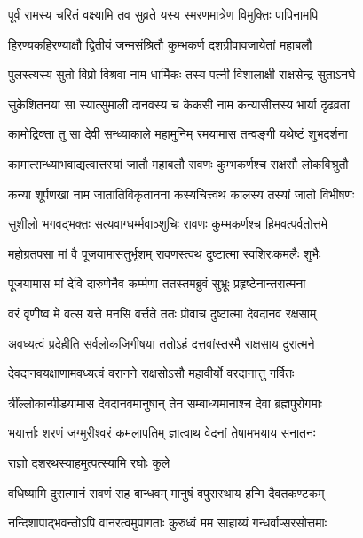 \twolineshloka
{पूर्वं रामस्य चरितं वक्ष्यामि तव सुव्रते}
{यस्य स्मरणमात्रेण विमुक्तिः पापिनामपि}%

\twolineshloka
{हिरण्यकहिरण्याक्षौ द्वितीयं जन्मसंश्रितौ}
{कुम्भकर्ण दशग्रीवावजायेतां महाबलौ}%

\twolineshloka
{पुलस्त्यस्य सुतो विप्रो विश्रवा नाम धार्मिकः}
{तस्य पत्नी विशालाक्षी राक्षसेन्द्र सुताऽनघे}%

\twolineshloka
{सुकेशितनया सा स्यात्सुमाली दानवस्य च}
{केकसी नाम कन्यासीत्तस्य भार्या दृढव्रता}%

\twolineshloka
{कामोद्रिक्ता तु सा देवी सन्ध्याकाले महामुनिम्}
{रमयामास तन्वङ्गी यथेष्टं शुभदर्शना}%

\twolineshloka
{कामात्सन्ध्याभवाद्यत्वात्तस्यां जातौ महाबलौ}
{रावणः कुम्भकर्णश्च राक्षसौ लोकविश्रुतौ}%

\twolineshloka
{कन्या शूर्पणखा नाम जातातिविकृतानना}
{कस्यचित्त्वथ कालस्य तस्यां जातो विभीषणः}%

\twolineshloka
{सुशीलो भगवद्भक्तः सत्यवाग्धर्म्मवाञ्शुचिः}
{रावणः कुम्भकर्णश्च हिमवत्पर्वतोत्तमे}%

\twolineshloka
{महोग्रतपसा मां वै पूजयामासतुर्भृशम्}
{रावणस्त्वथ दुष्टात्मा स्वशिरःकमलैः शुभैः}%

\twolineshloka
{पूजयामास मां देवि दारुणेनैव कर्म्मणा}
{ततस्तमब्रुवं सुभ्रूः प्रहृष्टेनान्तरात्मना}%

\twolineshloka
{वरं वृणीष्व मे वत्स यत्ते मनसि वर्त्तते}
{ततः प्रोवाच दुष्टात्मा देवदानव रक्षसाम्}%

\twolineshloka
{अवध्यत्वं प्रदेहीति सर्वलोकजिगीषया}
{ततोऽहं दत्तवांस्तस्मै राक्षसाय दुरात्मने}%

\twolineshloka
{देवदानवयक्षाणामवध्यत्वं वरानने}
{राक्षसोऽसौ महावीर्यो वरदानात्तु गर्वितः}%

\twolineshloka
{त्रींल्लोकान्पीडयामास देवदानवमानुषान्}
{तेन सम्बाध्यमानाश्च देवा ब्रह्मपुरोगमाः}%

\twolineshloka
{भयार्त्ताः शरणं जग्मुरीश्वरं कमलापतिम्}
{ज्ञात्वाथ वेदनां तेषामभयाय सनातनः}%


\onelineshloka
{राज्ञो दशरथस्याहमुत्पत्स्यामि रघोः कुले}%

\twolineshloka
{वधिष्यामि दुरात्मानं रावणं सह बान्धवम्}
{मानुषं वपुरास्थाय हन्मि दैवतकण्टकम्}%

\twolineshloka
{नन्दिशापाद्भवन्तोऽपि वानरत्वमुपागताः}
{कुरुध्वं मम साहाय्यं गन्धर्वाप्सरसोत्तमाः}%

